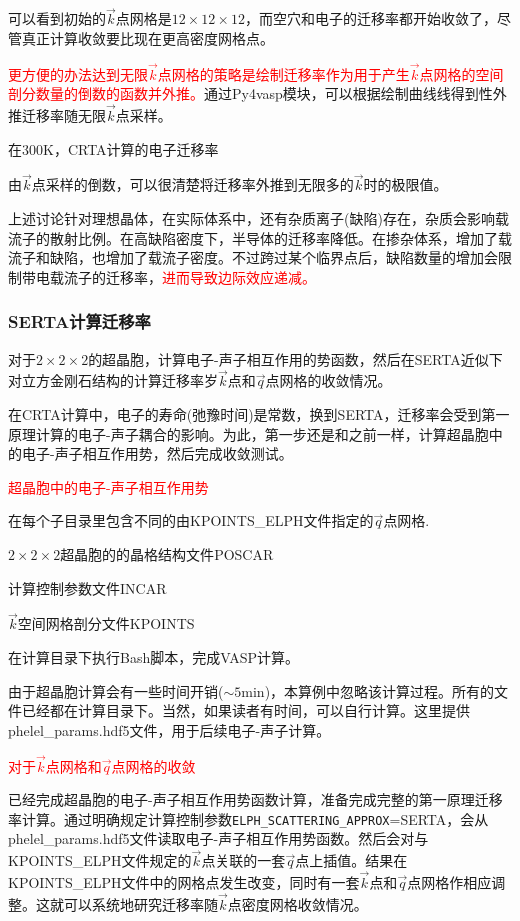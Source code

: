 可以看到初始的$\vec k$点网格是$12\times12\times12$，而空穴和电子的迁移率都开始收敛了，尽管真正计算收敛要比现在更高密度网格点。

\textcolor{red}{更方便的办法达到无限$\vec k$点网格的策略是绘制迁移率作为用于产生$\vec k$点网格的空间剖分数量的倒数的函数并外推。}通过\textrm{Py4vasp}模块，可以根据绘制曲线线得到性外推迁移率随无限$\vec k$点采样。

在\textrm{300K}，\textrm{CRTA}计算的电子迁移率

由$\vec k$点采样的倒数，可以很清楚将迁移率外推到无限多的$\vec k$时的极限值。

上述讨论针对理想晶体，在实际体系中，还有杂质离子(缺陷)存在，杂质会影响载流子的散射比例。在高缺陷密度下，半导体的迁移率降低。在掺杂体系，增加了载流子和缺陷，也增加了载流子密度。不过跨过某个临界点后，缺陷数量的增加会限制带电载流子的迁移率，\textcolor{red}{进而导致边际效应递减。 }

\subsubsection{\rm{SERTA}计算迁移率}
对于$2\times2\times2$的超晶胞，计算电子-声子相互作用的势函数，然后在\textrm{SERTA}近似下对立方金刚石结构的计算迁移率岁$\vec k$点和$\vec q$点网格的收敛情况。

在\textrm{CRTA}计算中，电子的寿命(弛豫时间)是常数，换到\textrm{SERTA}，迁移率会受到第一原理计算的电子-声子耦合的影响。为此，第一步还是和之前一样，计算超晶胞中的电子-声子相互作用势，然后完成收敛测试。

\textcolor{red}{超晶胞中的电子-声子相互作用势}

在每个子目录里包含不同的由\textrm{KPOINTS\_ELPH}文件指定的$\vec q$点网格.

$2\times2\times2$超晶胞的的晶格结构文件\textrm{POSCAR}

计算控制参数文件\textrm{INCAR}

$\vec k$空间网格剖分文件\textrm{KPOINTS}

在计算目录下执行\textrm{Bash}脚本，完成\textrm{VASP}计算。

由于超晶胞计算会有一些时间开销($\sim5\textrm{min}$)，本算例中忽略该计算过程。所有的文件已经都在计算目录下。当然，如果读者有时间，可以自行计算。这里提供\textrm{phelel\_params.hdf5}文件，用于后续电子-声子计算。

\textcolor{red}{对于$\vec k$点网格和$\vec q$点网格的收敛}

已经完成超晶胞的电子-声子相互作用势函数计算，准备完成完整的第一原理迁移率计算。通过明确规定计算控制参数\texttt{ELPH\_SCATTERING\_APPROX}=\textrm{SERTA}，会从\textrm{phelel\_params.hdf5}文件读取电子-声子相互作用势函数。然后会对与\textrm{KPOINTS\_ELPH}文件规定的$\vec k$点关联的一套$\vec q$点上插值。结果在\textrm{KPOINTS\_ELPH}文件中的网格点发生改变，同时有一套$\vec k$点和$\vec q$点网格作相应调整。这就可以系统地研究迁移率随$\vec k$点密度网格收敛情况。

